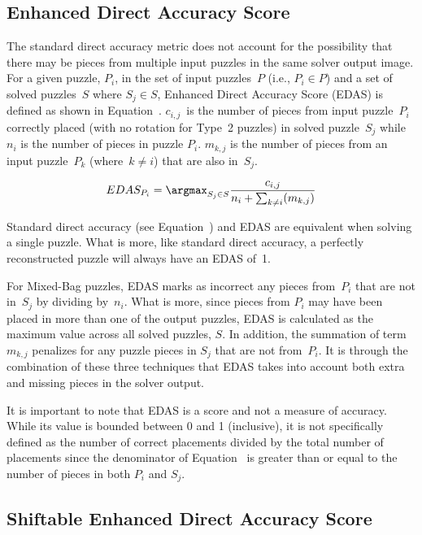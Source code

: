 \subsection{Enhanced Direct Accuracy Score}\label{sec:enhancedDirectAccuracyScore}

The standard direct accuracy metric does not account for the possibility that there may be pieces from multiple input puzzles in the same solver output image.  For a given puzzle, $P_i$, in the set of input puzzles~$P$ (i.e., $P_i \in P$) and a set of solved puzzles~$S$ where $S_j \in S$, Enhanced Direct Accuracy Score (EDAS) is defined as shown in Equation~.  $c_{i,j}$~is the number of pieces from input puzzle~$P_i$ correctly placed (with no rotation for Type~2 puzzles) in solved puzzle~$S_j$ while~$n_i$ is the number of pieces in puzzle $P_i$. $m_{k,j}$ is the number of pieces from an input puzzle~$P_k$ (where~$k \ne i$) that are also in~$S_j$.

\begin{equation} \label{eq:enhancedDirectAccuracyScore}
  EDAS_{P_i} = \argmax_{S_j \in S}\frac{c_{i,j}}{n_i + \sum_{k \ne i}(m_{k,j})}
\end{equation}

Standard direct accuracy (see Equation~) and EDAS are equivalent when solving a single puzzle. What is more, like standard direct accuracy, a perfectly reconstructed puzzle will always have an EDAS of~1. 

For Mixed-Bag puzzles, EDAS marks as incorrect any pieces from~$P_i$ that are not in~$S_j$ by dividing by~$n_i$.  What is more, since pieces from $P_i$ may have been placed in more than one of the output puzzles, EDAS is calculated as the maximum value across all solved puzzles, $S$.  In addition, the summation of term~$m_{k,j}$ penalizes for any puzzle pieces in $S_j$ that are not from~$P_i$.  It is through the combination of these three techniques that EDAS takes into account both extra and missing pieces in the solver output.

It is important to note that EDAS is a score and not a measure of accuracy. While its value is bounded between 0 and 1 (inclusive), it is not specifically defined as the number of correct placements divided by the total number of placements since the denominator of Equation~ is greater than or equal to the number of pieces in both $P_i$ and $S_j$.

\subsection{Shiftable Enhanced Direct Accuracy Score}\label{sec:shiftableEnhancedDirectAccuracy}

